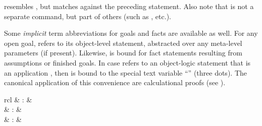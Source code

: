 \begin{isabellebody}
\begin{isamarkuptext}
\begin{descr}
  \item [\isa{{\isachardoublequote}{\isacharparenleft}{\isasymIS}\ p\isactrlsub {\isadigit{1}}\ {\isasymdots}\ p\isactrlsub n{\isacharparenright}{\isachardoublequote}}] resembles \hyperlink{command.let}{\mbox{}}, but matches  against the
  preceding statement.  Also note that \hyperlink{keyword.is}{\mbox{}} is not a
  separate command, but part of others (such as \hyperlink{command.assume}{\mbox{}},
  \hyperlink{command.have}{\mbox{}} etc.).

  \end{descr}

  Some \emph{implicit} term abbreviations
  for goals and facts are available as well.  For any open goal,
  \hyperlink{variable.thesis}{\mbox{}} refers to its object-level statement,
  abstracted over any meta-level parameters (if present).  Likewise,
  \hyperlink{variable.this}{\mbox{}} is bound for fact statements resulting from
  assumptions or finished goals.  In case \hyperlink{variable.this}{\mbox{}} refers to
  an object-logic statement that is an application , then
   is bound to the special text variable ``\hyperlink{variable.dots}{\mbox{\isa{{\isasymdots}}}}''
  (three dots).  The canonical application of this convenience are
  calculational proofs (see ).%
\end{isamarkuptext}%
\isamarkuptrue%
%
\isamarkuptrue%
%
\begin{isamarkuptext}%
\begin{matharray}{rcl}
    \hypertarget{command.next}{\hyperlink{command.next}{\mbox{}}} & : &  \\
    \hypertarget{command.braceleft}{\hyperlink{command.braceleft}{\mbox{\isa{\isacommand{{\isacharbraceleft}}}}}} & : &  \\
    \hypertarget{command.braceright}{\hyperlink{command.braceright}{\mbox{\isa{\isacommand{{\isacharbraceright}}}}}} & : &  \\
  \end{matharray}


\end{isamarkuptext}
\end{isabellebody}
